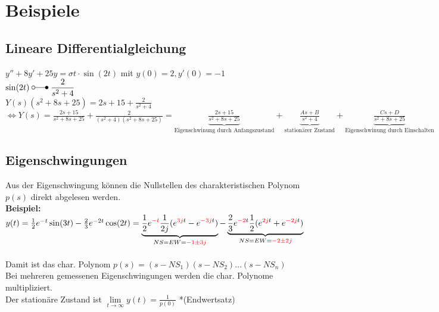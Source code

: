 \section{Beispiele}
	
	\subsection{Lineare Differentialgleichung}

		$y'' + 8y' + 25y = \sigma{t} \cdot \sin(2t)$ mit $y(0) = 2, y'(0) = -1$\\
		
		$\sin(2t) \; \laplace \; \dfrac{2}{s^2+4}$ \\ $Y(s)(s^2+8s+25) = 2s+15+\frac{2}{s^2+4}$
		$\Leftrightarrow Y(s) = \frac{2s+15}{s^2+8s+25}+\frac{2}{(s^2+4)(s^2+8s+25)}=
		\underbrace{\frac{2s+15}{s^2+8s+25}}_\text{Eigenschwinung durch Anfangszustand} +
		\underbrace{\frac{As + B}{s^2+4}}_\text{stationärer Zustand} +
		\underbrace{\frac{Cs + D}{s^2+8s+25}}_\text{Eigenschwinung durch Einschalten}$
		
	\subsection{Eigenschwingungen}
		Aus der Eigenschwingung können die Nullstellen des charakteristischen Polynom $p(s)$ 
		direkt abgelesen werden. \\[5mm]
		\textbf{Beispiel:} \\
		$y(t) = \frac{1}{2} e^{-t} \sin(3t) - \frac{2}{3} e^{-2t} \cos(2t) = 
		\underbrace{\frac{1}{2} e^{\textcolor{red}{-t}} \frac{1}{2j}(e^{\textcolor{red}{3j}t}
			-e^{\textcolor{red}{-3j}t})}_{NS = EW = \textcolor{red}{-1 \pm 3j}} - 
		\underbrace{\frac{2}{3} e^{\textcolor{red}{-2}t} \frac{1}{2}(e^{\textcolor{red}{2j}t}
			+e^{\textcolor{red}{-2j}t})}_{NS = EW = \textcolor{red}{-2 \pm 2j}}$ \\\\
		Damit ist das char. Polynom $p(s) = (s-NS_1)(s-NS_2)\ldots(s-NS_n)$ \\
		Bei mehreren gemessenen Eigenschwingungen werden die char. Polynome multipliziert. \\
		Der stationäre Zustand ist $\lim\limits_{t\rightarrow\infty}y(t) = \frac{1}{p(0)}$ *(Endwertsatz) \\